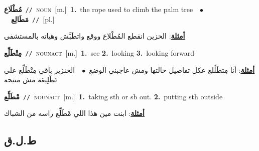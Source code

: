 \documentclass[10pt,a4paper,twoside]{article} %
\begin{document}
\begin{multicols}{2}
{\setlength\topsep{0pt}\textbf{\foreignlanguage{arabic}{مُطْلَاع}}\ {\color{gray}\texttt{//}\color{black}}\ \textsc{noun}\ [m.]\ \textbf{1.}~the rope used to climb the palm tree\ \ $\bullet$\ \ \setlength\topsep{0pt}\textbf{\foreignlanguage{arabic}{مَطَالِع}}\ {\color{gray}\texttt{//}\color{black}}\ [pl.]\  \begin{flushright}\color{gray}\foreignlanguage{arabic}{\textbf{\underline{\foreignlanguage{arabic}{أمثلة}}}: الحزين انقطع المُطْلاع ووقع واتطَبَّش وهياته بالمستشفى}\end{flushright}\color{black}} \vspace{2mm}

{\setlength\topsep{0pt}\textbf{\foreignlanguage{arabic}{مِتْطَلِّع}}\ {\color{gray}\texttt{//}\color{black}}\ \textsc{noun\textunderscore act}\ [m.]\ \textbf{1.}~see  \textbf{2.}~looking  \textbf{3.}~looking forward\  \begin{flushright}\color{gray}\foreignlanguage{arabic}{\textbf{\underline{\foreignlanguage{arabic}{أمثلة}}}: أنا مِتطَلِّلع عكل تفاصيل حالتها ومش عاجبني الوضع\ $\bullet$\ \  الخنزير باقي مِتْطَلِّع علي تَطْلِيعَة مش منيحة}\end{flushright}\color{black}} \vspace{2mm}

{\setlength\topsep{0pt}\textbf{\foreignlanguage{arabic}{مْطَلِّع}}\ {\color{gray}\texttt{//}\color{black}}\ \textsc{noun\textunderscore act}\ [m.]\ \textbf{1.}~taking sth or sb out.  \textbf{2.}~putting sth outside\  \begin{flushright}\color{gray}\foreignlanguage{arabic}{\textbf{\underline{\foreignlanguage{arabic}{أمثلة}}}: ابنت مين هذا اللي مْطَلِّع راسه من الشباك}\end{flushright}\color{black}} \vspace{2mm}

\vspace{-3mm}
\subsection*{\color{blue}\foreignlanguage{arabic}{ط.ل.ق}\color{blue}{}} 


\end{multicols}
\end{document}
